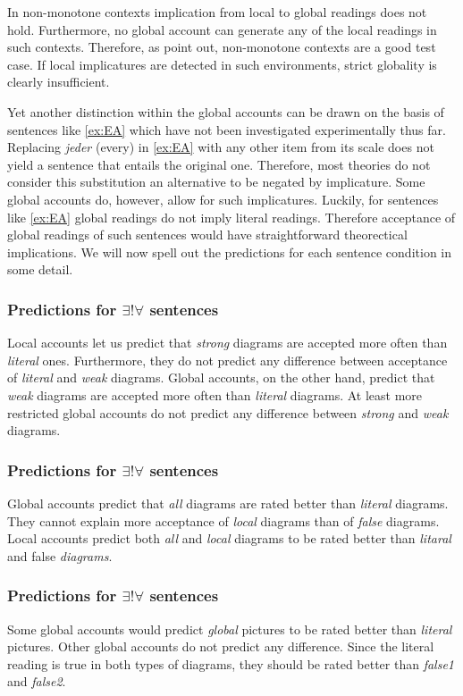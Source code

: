 \documentclass[a4paper,10pt]{article}
\begin{document}
In non-monotone contexts implication from local to global readings does not hold. Furthermore, no global account can generate any of the local readings in such contexts. Therefore, as  point out, non-monotone contexts are a good test case. If local implicatures are detected in such environments, strict globality is clearly insufficient. 

Yet another distinction within the global accounts can be drawn on the basis of sentences like \ref{ex:EA} which have not been investigated experimentally thus far. Replacing {\it jeder} (every) in \ref{ex:EA} with any other item from its scale does not yield a sentence that entails the original one. Therefore, most theories do not consider this substitution an alternative to be negated by implicature. Some global accounts do, however, allow for such implicatures. Luckily, for sentences like \ref{ex:EA}  global readings do not imply literal readings. Therefore acceptance of global readings of such sentences would have straightforward theorectical implications. We will now spell out the predictions for each sentence condition in some detail.

\subsubsection{Predictions for $\exists! \forall$ sentences}
Local accounts let us predict that {\it strong} diagrams are accepted more often than {\it literal} ones.  Furthermore, they do not predict any difference between acceptance of {\it literal} and {\it weak} diagrams. Global accounts, on the other hand, predict that {\it  weak} diagrams are accepted more often than {\it literal} diagrams. At least more restricted global accounts do not predict any difference between {\it strong} and {\it weak} diagrams.

\subsubsection{Predictions for $\exists! \forall$ sentences}
Global accounts predict that {\it all} diagrams are rated better than {\it literal} diagrams. They cannot explain more acceptance of {\it local} diagrams than of {\it false} diagrams. Local accounts predict both {\it all} and {\it local} diagrams to be rated better than {\it litaral} and false {\it diagrams}.


\subsubsection{Predictions for $\exists! \forall$ sentences}
Some global accounts would predict {\it global} pictures to be rated better than {\it literal} pictures. Other global accounts do not predict any difference. Since the literal reading is true in both types of diagrams, they should be rated better than {\it false1} and {\it false2}.
\end{document}

